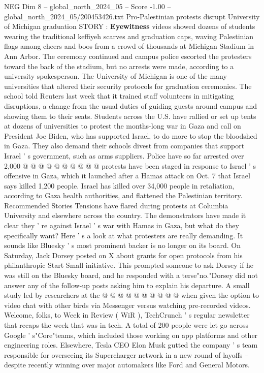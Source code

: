 \begin{textsample}{NEG Dim 8 – global\_north\_2024\_05 – Score -1.00 – global\_north\_2024\_05/200453426.txt}  \label{ex:f8_neg_383}
Pro-Palestinian protests disrupt University of Michigan graduation STORY : \textbf{Eyewitness} videos showed dozens of students wearing the traditional keffiyeh scarves and graduation caps, waving Palestinian flags among cheers and boos from a crowd of thousands at Michigan Stadium in Ann Arbor.
The ceremony continued and campus police escorted the protesters toward the back of the stadium, but no arrests were made, according to a university spokesperson.
The University of Michigan is one of the many universities that altered their security protocols for graduation ceremonies.
The school told Reuters last week that it trained staff volunteers in mitigating disruptions, a change from the usual duties of guiding guests around campus and showing them to their seats.
Students across the U.S. have rallied or set up tents at dozens of universities to protest the months-long war in Gaza and call on President Joe Biden, who has supported Israel, to do more to stop the bloodshed in Gaza.
They also demand their schools divest from companies that support Israel ' s government, such as arms suppliers.
Police have so far arrested over 2,000 @ @ @ @ @ @ @ @ @ @ protests have been staged in response to Israel ' s offensive in Gaza, which it launched after a Hamas attack on Oct. 7 that Israel says killed 1,200 people.
Israel has killed over 34,000 people in retaliation, according to Gaza health authorities, and flattened the Palestinian territory.
Recommended Stories Tensions have flared during protests at Columbia University and elsewhere across the country.
The demonstrators have made it clear they ' re against Israel ' s war with Hamas in Gaza, but what do they specifically want?
Here ' s a look at what protesters are really demanding.
It sounds like Bluesky ' s most prominent backer is no longer on its board.
On Saturday, Jack Dorsey posted on X about grants for open protocols from his philanthropic Start Small initiative.
This prompted someone to ask Dorsey if he was still on the Bluesky board, and he responded with a terse"no."Dorsey did not answer any of the follow-up posts asking him to explain his departure.
A small study led by researchers at the @ @ @ @ @ @ @ @ @ @ when given the option to video chat with other birds via Messenger versus watching pre-recorded videos.
Welcome, folks, to Week in Review ( WiR ), TechCrunch ' s regular newsletter that recaps the week that was in tech.
A total of 200 people were let go across Google ' s"Core"teams, which included those working on app platforms and other engineering roles.
Elsewhere, Tesla CEO Elon Musk gutted the company ' s team responsible for overseeing its Supercharger network in a new round of layoffs -- despite recently winning over major automakers like Ford and General Motors.

\end{textsample}
